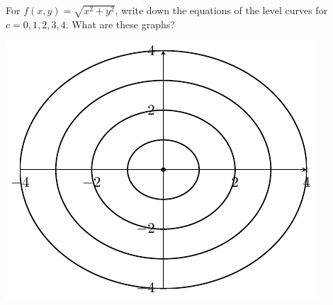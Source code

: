 \vspace{.5in}

\pagebreak

\begin{ex}\label{ex:cone}
    For $f(x,y)=\sqrt{x^2+y^2}$, write down the equations of the level curves for $c=0,1,2,3,4$. What are these graphs?
\end{ex}

\vfill 

{\centering 
    \includegraphics[scale=1]{tikz-pictures/section-9.1-again-pic4-level-curves-cone-1.pdf}
\par} 

